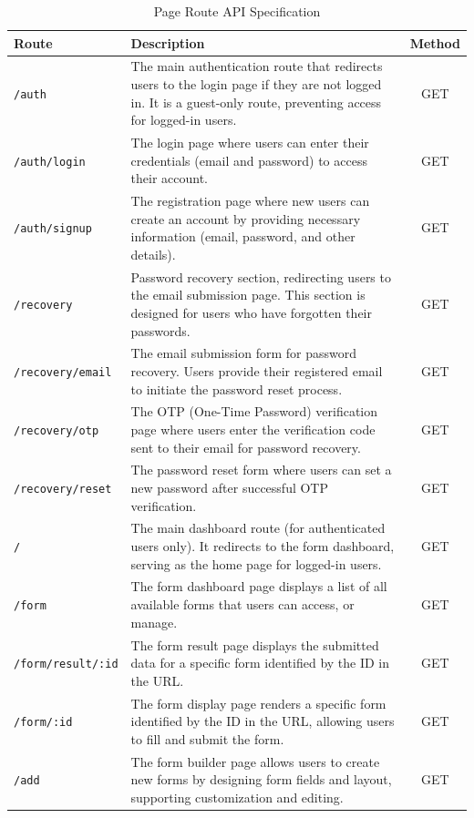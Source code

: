 \documentclass[12pt,oneside,openright,a4paper]{cpe-english-project}
\begin{document}
\begin{table}[h]
\centering
\caption{Page Route API Specification}
\begin{tabular}{|l|p{9cm}|c|}
\hline
\textbf{Route} & \textbf{Description} & \textbf{Method} \\
\hline
\texttt{/auth} & The main authentication route that redirects users to the login page if they are not logged in. It is a guest-only route, preventing access for logged-in users. & GET \\
\hline
\texttt{/auth/login} & The login page where users can enter their credentials (email and password) to access their account. & GET \\
\hline
\texttt{/auth/signup} & The registration page where new users can create an account by providing necessary information (email, password, and other details). & GET \\
\hline
\texttt{/recovery} & Password recovery section, redirecting users to the email submission page. This section is designed for users who have forgotten their passwords. & GET \\
\hline
\texttt{/recovery/email} & The email submission form for password recovery. Users provide their registered email to initiate the password reset process. & GET \\
\hline
\texttt{/recovery/otp} & The OTP (One-Time Password) verification page where users enter the verification code sent to their email for password recovery. & GET \\
\hline
\texttt{/recovery/reset} & The password reset form where users can set a new password after successful OTP verification. & GET \\
\hline
\texttt{/} & The main dashboard route (for authenticated users only). It redirects to the form dashboard, serving as the home page for logged-in users. & GET \\
\hline
\texttt{/form} & The form dashboard page displays a list of all available forms that users can access, or manage. & GET \\
\hline
\texttt{/form/result/:id} & The form result page displays the submitted data for a specific form identified by the ID in the URL. & GET \\
\hline
\texttt{/form/:id} & The form display page renders a specific form identified by the ID in the URL, allowing users to fill and submit the form. & GET \\
\hline
\texttt{/add} & The form builder page allows users to create new forms by designing form fields and layout, supporting customization and editing. & GET \\

\end{tabular}
\end{table}
\end{document}
